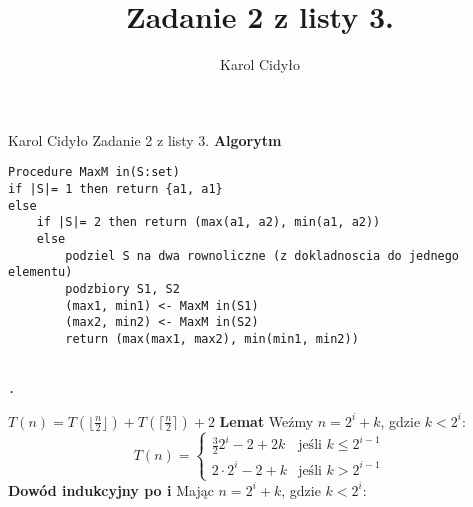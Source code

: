 \documentclass[a4paper,10pt]{article}
\author{Karol Cidyło}
\title {Zadanie 2 z listy 3.}
\begin{document}
Karol Cidyło \newline \newline \newline
Zadanie 2 z listy 3. \newline \newline
\textbf{Algorytm} \newline
\begin{lstlisting}
Procedure MaxM in(S:set)
if |S|= 1 then return {a1, a1}
else
    if |S|= 2 then return (max(a1, a2), min(a1, a2))
    else
        podziel S na dwa rownoliczne (z dokladnoscia do jednego elementu)
        podzbiory S1, S2
        (max1, min1) <- MaxM in(S1)
        (max2, min2) <- MaxM in(S2)
        return (max(max1, max2), min(min1, min2))
        

.
\end{lstlisting}
$T(n) = T(\lfloor \frac{n}{2} \rfloor) + T(\lceil \frac{n}{2}\rceil) + 2$ \newline \newline
\textbf{Lemat} \newline
Weźmy $ n = 2^i +k$, gdzie $k < 2^i$: \newline
$$T(n) =  \begin{cases} 
      \frac{3}{2} 2^i - 2 + 2k & \text{jeśli } k\leq 2^{i-1} \\
      2 \cdot 2^{i} - 2 + k & \text{jeśli } k > 2^{i-1} 
   \end{cases}
$$
\textbf{Dowód indukcyjny po i} \newline
Mając $ n = 2^i +k$, gdzie $k < 2^i$: \newline
\end{document}
